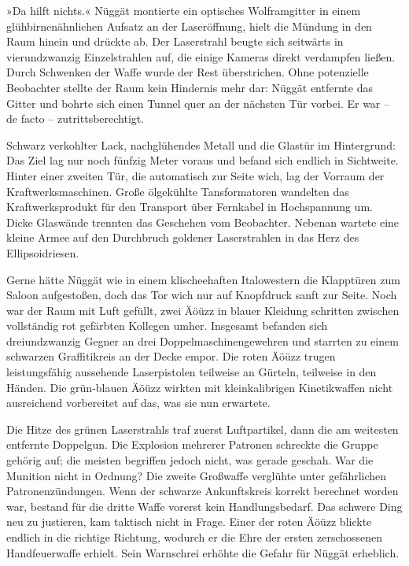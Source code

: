 »Da hilft nichts.« Nüggät montierte ein optisches Wolframgitter in einem glühbirnenähnlichen Aufsatz an der Laseröffnung, hielt die Mündung in den Raum hinein und drückte ab. Der Laserstrahl beugte sich seitwärts in vierundzwanzig Einzelstrahlen auf, die einige Kameras direkt verdampfen ließen. Durch Schwenken der Waffe wurde der Rest überstrichen. Ohne potenzielle Beobachter stellte der Raum kein Hindernis mehr dar: Nüggät entfernte das Gitter und bohrte sich einen Tunnel quer an der nächsten Tür vorbei. Er war – de facto – zutrittsberechtigt.

Schwarz verkohlter Lack, nachglühendes Metall und die Glastür im Hintergrund: Das Ziel lag nur noch fünfzig Meter voraus und befand sich endlich in Sichtweite. Hinter einer zweiten Tür, die automatisch zur Seite wich, lag der Vorraum der Kraftwerksmaschinen. Große ölgekühlte Tansformatoren wandelten das Kraftwerksprodukt für den Transport über Fernkabel in Hochspannung um. Dicke Glaswände trennten das Geschehen vom Beobachter. Nebenan wartete eine kleine Armee auf den Durchbruch goldener Laserstrahlen in das Herz des Ellipsoidriesen.

Gerne hätte Nüggät wie in einem klischeehaften Italowestern die Klapptüren zum Saloon aufgestoßen, doch das Tor wich nur auf Knopfdruck sanft zur Seite. Noch war der Raum mit Luft gefüllt, zwei Äöüzz in blauer Kleidung schritten zwischen vollständig rot gefärbten Kollegen umher. Insgesamt befanden sich dreiundzwanzig Gegner an drei Doppelmaschinengewehren und starrten zu einem schwarzen Graffitikreis an der Decke empor. Die roten Äöüzz trugen leistungsfähig aussehende Laserpistolen teilweise an Gürteln, teilweise in den Händen. Die grün-blauen Äöüzz wirkten mit kleinkalibrigen Kinetikwaffen nicht ausreichend vorbereitet auf das, was sie nun erwartete.

Die Hitze des grünen Laserstrahls traf zuerst Luftpartikel, dann die am weitesten entfernte Doppelgun. Die Explosion mehrerer Patronen schreckte die Gruppe gehörig auf; die meisten begriffen jedoch nicht, was gerade geschah. War die Munition nicht in Ordnung? Die zweite Großwaffe verglühte unter gefährlichen Patronenzündungen. Wenn der schwarze Ankunftskreis korrekt berechnet worden war, bestand für die dritte Waffe vorerst kein Handlungsbedarf. Das schwere Ding neu zu justieren, kam taktisch nicht in Frage. Einer der roten Äöüzz blickte endlich in die richtige Richtung, wodurch er die Ehre der ersten zerschossenen Handfeuerwaffe erhielt. Sein Warnschrei erhöhte die Gefahr für Nüggät erheblich.

